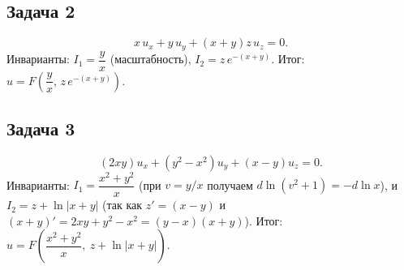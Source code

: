 \documentclass[12pt]{article}
\begin{document}
\subsection*{Задача 2}
\[
x\,u_x+y\,u_y+(x+y)z\,u_z=0.
\]
Инварианты: \(I_1=\dfrac{y}{x}\) (масштабность), \(I_2=z\,e^{-(x+y)}\).
Итог: \(u=F\!\left(\dfrac{y}{x},\,z\,e^{-(x+y)}\right)\).

\subsection*{Задача 3}
\[
(2xy)u_x+(y^2-x^2)u_y+(x-y)u_z=0.
\]
Инварианты: \(I_1=\dfrac{x^2+y^2}{x}\) (при $v=y/x$ получаем $d\ln(v^2+1)=-d\ln x$),
и \(I_2=z+\ln|x+y|\) (так как $z'=(x-y)$ и $(x+y)'=2xy+y^2-x^2=(y-x)(x+y)$).
Итог: \(u=F\!\left(\dfrac{x^2+y^2}{x},\ z+\ln|x+y|\right)\).
\end{document}
